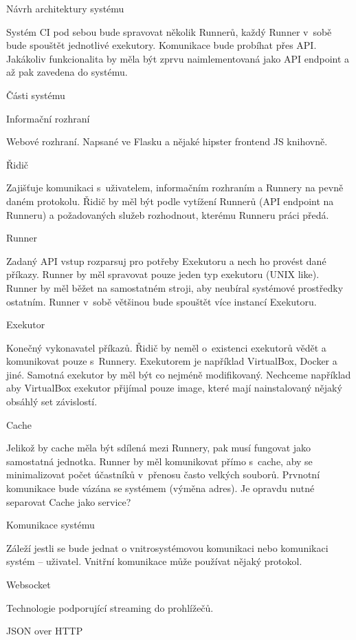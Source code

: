 \chap Návrh architektury systému

Systém CI pod sebou bude spravovat několik Runnerů, každý Runner v~sobě bude spouštět jednotlivé exekutory.
Komunikace bude probíhat přes API.
Jakákoliv funkcionalita by měla být zprvu naimlementovaná jako API endpoint a až pak zavedena do systému.

\sec Části systému

\secc Informační rozhraní

Webové rozhraní.
Napsané ve Flasku a nějaké hipster frontend JS knihovně.

\secc Řidič

Zajišťuje komunikaci s~uživatelem, informačním rozhraním a Runnery na pevně daném protokolu.
Řidič by měl být podle vytížení Runnerů (API endpoint na Runneru) a požadovaných služeb rozhodnout, kterému Runneru práci předá.

\secc Runner

Zadaný API vstup rozparsuj pro potřeby Exekutoru a nech ho provést dané příkazy.
Runner by měl spravovat pouze jeden typ exekutoru (UNIX like).
Runner by měl běžet na samostatném stroji, aby neubíral systémové prostředky ostatním.
Runner v~sobě většinou bude spouštět více instancí Exekutoru.

\seccc Exekutor

Konečný vykonavatel příkazů. Řidič by neměl o~existenci exekutorů vědět a komunikovat pouze s~Runnery.
Exekutorem je například VirtualBox, Docker a jiné.
Samotná exekutor by měl být co nejméně modifikovaný.
Nechceme například aby VirtualBox exekutor přijímal pouze image, které mají nainstalovaný nějaký obsáhlý set závislostí.

\secc Cache

Jelikož by cache měla být sdílená mezi Runnery, pak musí fungovat jako samostatná jednotka.
Runner by měl komunikovat přímo s~cache, aby se minimalizovat počet účastníků v~přenosu často velkých souborů.
Prvnotní komunikace bude vázána se systémem (výměna adres).
Je opravdu nutné separovat Cache jako service?

\sec Komunikace systému

Záleží jestli se bude jednat o vnitrosystémovou komunikaci nebo komunikaci systém -- uživatel.
Vnitřní komunikace může používat nějaký  protokol.

\secc Websocket

Technologie podporující streaming do prohlížečů.

\secc JSON over HTTP


